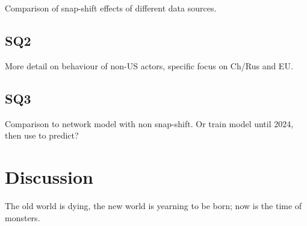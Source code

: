 \documentclass[12pt,a4paper]{article}
\begin{document}
Comparison of snap-shift effects of different data sources.

\subsection{SQ2}

More detail on behaviour of non-US actors, specific focus on Ch/Rus and EU.

\subsection{SQ3}

Comparison to network model with non snap-shift. Or train model until 2024, then use to predict?

\section{Discussion}

The old world is dying, the new world is yearning to be born; now is the time of monsters. 

\clearpage


\end{document}
